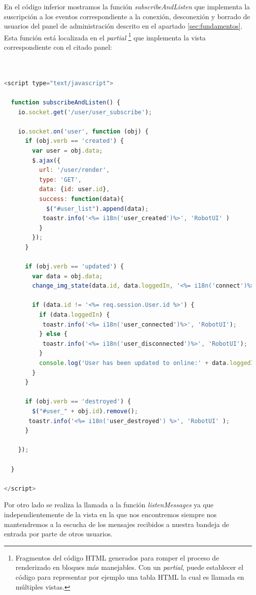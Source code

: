 En el código inferior mostramos la función \emph{subscribeAndListen} que implementa la suscripción a los eventos correspondiente a la conexión, desconexión y borrado de usuarios del panel de
administración descrito en el apartado \ref{sec:fundamentos}. Esta función está localizada en el \emph{partial} \footnote{ Fragmentos del código HTML generados para romper el proceso de
renderizado en bloques más manejables. Con un \emph{partial}, puede establecer el código para representar por ejemplo una tabla HTML la cual es llamada en múltiples vistas.} 
que implementa la vista correspondiente con el citado panel:\\

\begin{lstlisting}[language=JavaScript]


<script type="text/javascript">

  function subscribeAndListen() {
    io.socket.get('/user/user_subscribe');

    io.socket.on('user', function (obj) {
      if (obj.verb == 'created') {
        var user = obj.data;
        $.ajax({
          url: '/user/render',
          type: 'GET',
          data: {id: user.id},
          success: function(data){
            $("#user_list").append(data);
           toastr.info('<%= i18n('user_created')%>', 'RobotUI' )
          }
        });
      }

      if (obj.verb == 'updated') {
        var data = obj.data;
        change_img_state(data.id, data.loggedIn, '<%= i18n('connect')%>', '<%= i18n('disconnect')%>');

        if (data.id != '<%= req.session.User.id %>') {
          if (data.loggedIn) {
           toastr.info('<%= i18n('user_connected')%>', 'RobotUI');
          } else {
           toastr.info('<%= i18n('user_disconnected')%>', 'RobotUI');
          }
          console.log('User has been updated to online:' + data.loggedIn);
        }
      }

      if (obj.verb == 'destroyed') {
        $("#user_" + obj.id).remove();
       toastr.info('<%= i18n('user_destroyed') %>', 'RobotUI' );
      }

    });

  }

</script>

\end{lstlisting}


Por otro lado se realiza la llamada a la función \emph{listenMessages} ya que independientemente de la vista en la que nos encontremos siempre nos mantendremos a la escucha de los mensajes 
recibidos a nuestra bandeja de entrada por parte de otros usuarios.\\

